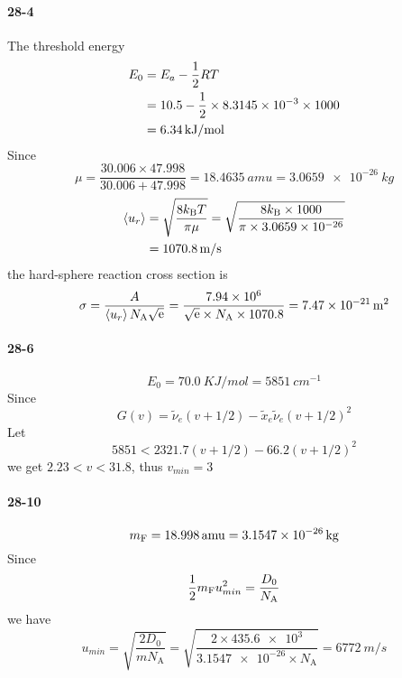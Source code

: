 \documentclass[a4paper]{article}
\DeclareMathOperator{\e}{\mathrm{e}}
\newcommand{\NA}{N_\mathrm{A}}
\newcommand{\kB}{k_\mathrm{B}}
\newcommand{\ex}[1]{\paragraph{#1}}
\numberwithin{equation}{section}
\begin{document}
\ex{28-4}
The threshold energy
\begin{align}
E_0 &= E_a - \dfrac{1}{2}RT \notag\\
&= 10.5 - \dfrac{1}{2}\times \num{8.3145e-3}\times 1000 \notag\\
&= \SI{6.34}{kJ/mol} 
\end{align}
Since %
\begin{equation}\label{key}
\mu = \dfrac{30.006\times 47.998}{30.006 + 47.998} = \SI{18.4635}{amu} = \SI{3.0659e-26}{kg}
\end{equation}
\begin{align}
\ev{u_r} &= \sqrt{\dfrac{8\kB T}{\pi \mu}} = \sqrt{\dfrac{8\kB \times 1000}{\pi \times \num{3.0659e-26}}} \notag\\
&= \SI{1070.8}{m/s}
\end{align}
the hard-sphere reaction cross section is
\begin{equation}\label{key}
\sigma = \dfrac{A}{\ev{u_r}\NA \sqrt{\e}} = \dfrac{\num{7.94e6}}{\sqrt{\e}\times \NA \times 1070.8} = \SI{7.47e-21}{m^2}
\end{equation}

\ex{28-6}
\begin{equation}\label{key}
E_0 = \SI{70.0}{KJ/mol} = \SI{5851}{cm^{-1}}
\end{equation}
Since 
\begin{equation}\label{key}
G(v) = \tilde{\nu}_e(v + 1/2) - \tilde{x}_e\tilde{\nu}_e(v+1/2)^2
\end{equation}
Let
\begin{equation}\label{key}
5851 < 2321.7(v+1/2) - 66.2(v+1/2)^2
\end{equation}
we get
$ 2.23 < v < 31.8 $, thus $ v_{min} = 3 $


\ex{28-10}
\begin{equation}\label{key}
m_{\ce{F}} = \SI{18.998}{amu} = \SI{3.1547e-26}{kg}
\end{equation}
Since
\begin{equation}\label{key}
\dfrac{1}{2}m_{\ce{F}} u_{min}^2 = \dfrac{D_0}{\NA}
\end{equation}
we have
\begin{equation}\label{key}
u_{min} = \sqrt{\dfrac{2 D_0}{m\NA}} = \sqrt{\dfrac{2\times \num{435.6e3}}{\num{3.1547e-26}\times \NA}} = \SI{6772}{m/s}
\end{equation}
\vspace{30pt}~\\
\end{document}
